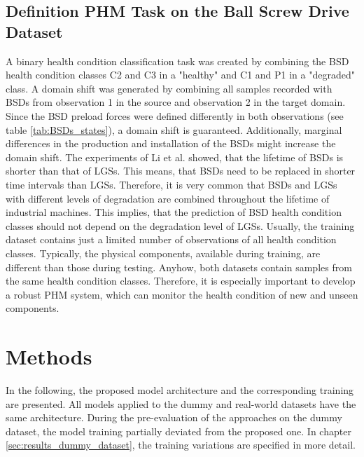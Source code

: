 \subsection{Definition PHM Task on the Ball Screw Drive Dataset}
A binary health condition classification task was created by combining the BSD health condition classes C2 and C3 in a "healthy" and C1 and P1 in a "degraded" class. A domain shift was generated by combining all samples recorded with BSDs from observation 1 in the source and observation 2 in the target domain. Since the BSD preload forces were defined differently in both observations (see table \ref{tab:BSDs_states}), a domain shift is guaranteed. Additionally, marginal differences in the production and installation of the BSDs might increase the domain shift. The experiments of Li et al. \cite{Li2018} showed, that the lifetime of BSDs is shorter than that of LGSs. This means, that BSDs need to be replaced in shorter time intervals than LGSs. Therefore, it is very common that BSDs and LGSs with different levels of degradation are combined throughout the lifetime of industrial machines. This implies, that the prediction of BSD health condition classes should not depend on the degradation level of LGSs. Usually, the training dataset contains just a limited number of observations of all health condition classes. Typically, the physical components, available during training, are different than those during testing. Anyhow, both datasets contain samples from the same health condition classes. Therefore, it is especially important to develop a robust PHM system, which can monitor the health condition of new and unseen components.

\section{Methods}\label{chapter:introduction}
In the following, the proposed model architecture and the corresponding training are presented. All models applied to the dummy and real-world datasets have the same architecture. During the pre-evaluation of the approaches on the dummy dataset, the model training partially deviated from the proposed one. In chapter \ref{sec:results_dummy_dataset}, the training variations are specified in more detail. 

